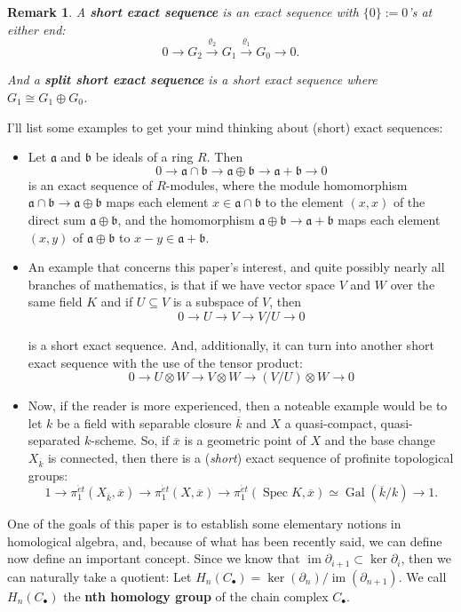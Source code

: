 \documentclass[12pt,reqno]{amsart}
\theoremstyle{plain}
\newtheorem{rem}{Remark}
\DeclareMathOperator{\spec}{Spec}
\DeclareMathOperator{\im}{im}
\DeclareMathOperator{\gal}{Gal}
\newcommand{\ideala}{\mathfrak{a}}
\newcommand{\idealb}{\mathfrak{b}}
\begin{document}
\begin{rem} A \textbf{short exact sequence} is an exact sequence with $ \{ 0 \} :=0$'s at either end:  
$$ 0 \rightarrow G_{2} \xrightarrow{\varrho_2} G_1 \xrightarrow{\varrho_1} G_{0} \rightarrow 0 .$$

And a \textbf{split short exact sequence} is a short exact sequence where $G_1 \cong G_1 \oplus G_0$. 
\end{rem} 
I'll list some examples to get your mind thinking about (short) exact sequences: 
\begin{itemize} 
\item Let $\ideala$ and $\idealb$ be ideals of a ring $R$. Then 
$$ 0 \longrightarrow \ideala \cap \idealb \longrightarrow \ideala \oplus \idealb \longrightarrow \ideala + \idealb \longrightarrow 0$$
is an exact sequence of $R$-modules, where the module homomorphism $\ideala \cap \idealb \longrightarrow \ideala \oplus \idealb $ maps each element $x \in \ideala \cap \idealb$ to the element $(x, x)$ of the direct sum $\ideala \oplus \idealb$, and the homomorphism $\ideala \oplus \idealb \to \ideala + \idealb$ maps each element $(x, y)$ of $\ideala \oplus \idealb$ to $x-y \in \ideala + \idealb$. 

\item An example that concerns this paper's interest, and quite possibly nearly all branches of mathematics, is that if we have vector space $V$ and $W$ over the same field $K$ and if $U \subseteq V$ is a subspace of $V$, then
$$ 0 \longrightarrow U \longrightarrow V \longrightarrow V/ U \longrightarrow 0$$

is a short exact sequence. And, additionally, it can turn into another short exact sequence with the use of the tensor product: 
$$ 0 \longrightarrow U \otimes W \longrightarrow V \otimes W \longrightarrow (V / U) \otimes W  \longrightarrow 0$$

\item Now, if the reader is more experienced, then a noteable example would be to let $k$ be a field with separable closure $\overline{k}$ and $X$ a quasi-compact, quasi-separated $k$-scheme. So, if $\overline{x}$ is a geometric point of $X$ and the base change $X_{\overline{k}}$ is connected, then there is a (\textit{short}) exact sequence of profinite topological groups:
$$1 \longrightarrow \pi_1^{\acute{e}t} (X_{\overline{k}}, \overline{x}) \longrightarrow  \pi_1^{\acute{e}t} (X, \overline{x}) \longrightarrow  \pi_1^{\acute{e}t} (\spec K, \overline{x})\simeq \gal (\overline{k} / k) \longrightarrow 1 .$$

\end{itemize} 
One of the goals of this paper is to establish some elementary notions in homological algebra, and, because of what has been recently said, we can define now define an important concept. Since we know that $\im \partial_{i+1} \subset \ker \partial_i$, then we can naturally take a quotient: Let $ H_n (C_\bullet) = \ker (\partial_n) / \im (\partial_{n+1})$. We call $H_n (C_{\bullet})$ the  \textbf{nth homology group} of the chain complex $C_\bullet$. 
\end{document}
